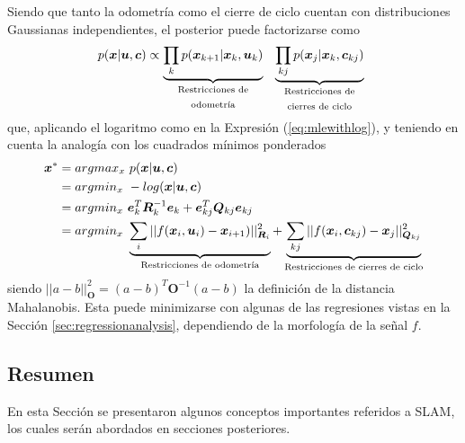 Siendo que tanto la odometría como el cierre de ciclo cuentan con distribuciones Gaussianas independientes, el posterior puede factorizarse como
\begin{equation}
    p(\bm{x}|\bm{u},\bm{c}) \propto \underbrace{\prod_k p(\bm{x}_{k+1}|\bm{x}_{k},\bm{u}_k)}_{\text{\parbox{10em}{\centering Restricciones de odometría}}}\ \underbrace{\prod_{kj}p(\bm{x}_j|\bm{x}_k,\bm{c}_{kj})}_{\text{\parbox{10em}{\centering Restricciones de cierres de ciclo}}}
\end{equation}
que, aplicando el logaritmo como en la Expresión (\ref{eq:mlewithlog}), y teniendo en cuenta la analogía con los cuadrados mínimos ponderados
\begin{align}
    \bm{x}^* &= argmax_x\ p(\bm{x}|\bm{u},\bm{c}) \\
    &= argmin_x\ -log(\bm{x}|\bm{u},\bm{c}) \\
     &= argmin_x\ \bm{e}_k^T\bm{R}_k^{-1}\bm{e}_k + \bm{e}_{kj}^T\bm{Q}_{kj}\bm{e}_{kj} \\
     &= argmin_x\ \underbrace{\sum_{i} ||f(\bm{x}_i,\bm{u}_i)-\bm{x}_{i+1})||^2_{\bm{R}_i}}_{\text{{\centering Restricciones de odometría}}} + \underbrace{\sum_{kj} ||f(\bm{x}_i,\bm{c}_{kj}) - \bm{x}_{j}||^2_{\bm{Q}_{kj}}}_{\text{{\centering Restricciones de cierres de ciclo}}}
\end{align}
siendo $||a-b||^2_{\bm{O}} = (a - b)^T\bm{O}^{-1}(a-b)$ la definición de la distancia Mahalanobis. Esta puede minimizarse con algunas de las regresiones vistas en la Sección \ref{sec:regressionanalysis}, dependiendo de la morfología de la señal $f$.

\fi


\subsection{Resumen}
En esta Sección se presentaron algunos conceptos importantes referidos a SLAM, los cuales serán abordados en secciones posteriores.